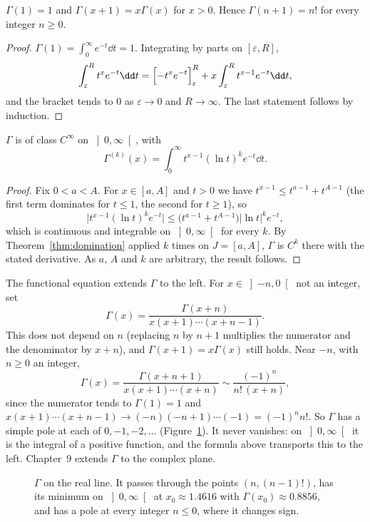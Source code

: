 \begin{proposition}\label{prop:gammafe}
$\Gamma(1)=1$ and $\Gamma(x+1)=x\Gamma(x)$ for $x>0$. Hence $\Gamma(n+1)=n!$ for every integer $n\ge0$.
\end{proposition}
\begin{proof}
$\Gamma(1)=\int_0^\infty e^{-t}\dd t=1$. Integrating by parts on $[\varepsilon,R]$,
\[
\int_\varepsilon^Rt^xe^{-t}\dd t=\Bigl[-t^xe^{-t}\Bigr]_\varepsilon^R+x\int_\varepsilon^Rt^{x-1}e^{-t}\dd t,
\]
and the bracket tends to $0$ as $\varepsilon\to0$ and $R\to\infty$. The last statement follows by induction.
\end{proof}

\begin{proposition}\label{prop:gammasmooth}
$\Gamma$ is of class $C^\infty$ on $\left]0,\infty\right[$, with
\[
\Gamma^{(k)}(x)=\int_0^\infty t^{x-1}(\ln t)^ke^{-t}\dd t.
\]
\end{proposition}
\begin{proof}
Fix $0<a<A$. For $x\in[a,A]$ and $t>0$ we have $t^{x-1}\le t^{a-1}+t^{A-1}$ (the first term dominates for $t\le1$, the second
for $t\ge1$), so
\[
\bigl|t^{x-1}(\ln t)^ke^{-t}\bigr|\le\bigl(t^{a-1}+t^{A-1}\bigr)|\ln t|^ke^{-t},
\]
which is continuous and integrable on $\left]0,\infty\right[$ for every $k$. By Theorem~\ref{thm:domination} applied $k$ times on
$J=[a,A]$, $\Gamma$ is $C^k$ there with the stated derivative. As $a$, $A$ and $k$ are arbitrary, the result follows.
\end{proof}

The functional equation extends $\Gamma$ to the left. For $x\in\left]-n,0\right[$ not an integer, set
\[
\Gamma(x)=\frac{\Gamma(x+n)}{x(x+1)\cdots(x+n-1)}.
\]
This does not depend on $n$ (replacing $n$ by $n+1$ multiplies the numerator and the denominator by $x+n$), and
$\Gamma(x+1)=x\Gamma(x)$ still holds. Near $-n$, with $n\ge0$ an integer,
\[
\Gamma(x)=\frac{\Gamma(x+n+1)}{x(x+1)\cdots(x+n)}\sim\frac{(-1)^n}{n!\,(x+n)},
\]
since the numerator tends to $\Gamma(1)=1$ and $x(x+1)\cdots(x+n-1)\to(-n)(-n+1)\cdots(-1)=(-1)^nn!$. So $\Gamma$ has a
simple pole at each of $0,-1,-2,\dots$ (Figure~\ref{fig:gamma}). It never vanishes: on $\left]0,\infty\right[$ it is the integral of a
positive function, and the formula above transports this to the left. Chapter~9 extends $\Gamma$ to the complex plane.

\begin{figure}[ht]
\centering
{}
\caption{$\Gamma$ on the real line. It passes through the points $(n,(n-1)!)$, has its minimum on $\left]0,\infty\right[$ at
$x_0\approx1.4616$ with $\Gamma(x_0)\approx0.8856$, and has a pole at every integer $n\le0$, where it changes sign.}
\label{fig:gamma}
\end{figure}

